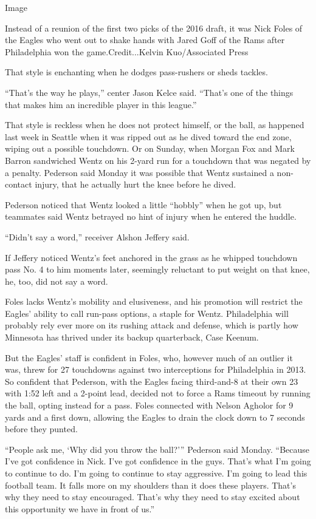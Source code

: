 Image

Instead of a reunion of the first two picks of the 2016 draft, it was
Nick Foles of the Eagles who went out to shake hands with Jared Goff of
the Rams after Philadelphia won the game.Credit...Kelvin Kuo/Associated
Press

That style is enchanting when he dodges pass-rushers or sheds tackles.

``That's the way he plays,'' center Jason Kelce said. ``That's one of
the things that makes him an incredible player in this league.''

That style is reckless when he does not protect himself, or the ball, as
happened last week in Seattle when it was ripped out as he dived toward
the end zone, wiping out a possible touchdown. Or on Sunday, when Morgan
Fox and Mark Barron sandwiched Wentz on his 2-yard run for a touchdown
that was negated by a penalty. Pederson said Monday it was possible that
Wentz sustained a non-contact injury, that he actually hurt the knee
before he dived.

Pederson noticed that Wentz looked a little ``hobbly'' when he got up,
but teammates said Wentz betrayed no hint of injury when he entered the
huddle.

``Didn't say a word,'' receiver Alshon Jeffery said.

If Jeffery noticed Wentz's feet anchored in the grass as he whipped
touchdown pass No. 4 to him moments later, seemingly reluctant to put
weight on that knee, he, too, did not say a word.

Foles lacks Wentz's mobility and elusiveness, and his promotion will
restrict the Eagles' ability to call run-pass options, a staple for
Wentz. Philadelphia will probably rely ever more on its rushing attack
and defense, which is partly how Minnesota has thrived under its backup
quarterback, Case Keenum.

But the Eagles' staff is confident in Foles, who, however much of an
outlier it was, threw for 27 touchdowns against two interceptions for
Philadelphia in 2013. So confident that Pederson, with the Eagles facing
third-and-8 at their own 23 with 1:52 left and a 2-point lead, decided
not to force a Rams timeout by running the ball, opting instead for a
pass. Foles connected with Nelson Agholor for 9 yards and a first down,
allowing the Eagles to drain the clock down to 7 seconds before they
punted.

``People ask me, `Why did you throw the ball?''' Pederson said Monday.
``Because I've got confidence in Nick. I've got confidence in the guys.
That's what I'm going to continue to do. I'm going to continue to stay
aggressive. I'm going to lead this football team. It falls more on my
shoulders than it does these players. That's why they need to stay
encouraged. That's why they need to stay excited about this opportunity
we have in front of us.''

